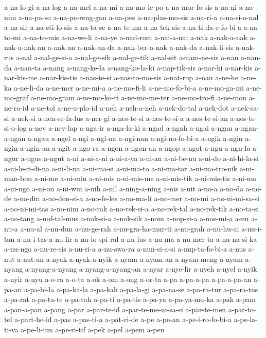 {a-na-lo-gi a-na-log a-na-mel a-na-mi a-na-mo-le-po a-na-mor-fo-sis a-na-ni
a-na-nim a-na-pa-so a-na-pe-reng-gan a-na-pes a-na-plas-mo-sis a-na-ri-a
a-na-si-o-nal a-na-sir a-na-sti-lo-sis a-na-ta-se a-na-te-ma a-na-tek-sis
a-na-ti-da-e-fo-bi-a a-na-to-mi a-na-to-mis a-na-we-li a-na-ye a-nad-rom
a-nai-a-nai a-nak a-nak-a-nak a-nak-a-nak-an a-nak-an a-nak-an-da
a-nak-ber-a-nak a-nak-da a-nak-li-sis a-nak-rus a-nal a-nal-ge-si-a
a-nal-ge-sik a-nal-ge-tik a-nal-sit a-nam-ne-sis a-nan a-nan-da a-nan-ta
a-nang a-nang-ke-la a-nang-ko-la-ki a-nap-tik-sis a-nar-ki a-nar-kis
a-nar-kis-me a-nar-kis-tis a-nas-te-si a-nas-to-mo-sis a-nat-rop a-nau
a-ne-he a-ne-ka a-ne-li-da a-ne-mer a-ne-mi-a a-ne-mo-fi-li
a-ne-mo-fo-bi-a a-ne-mo-ga-mi a-ne-mo-graf a-ne-mo-gram a-ne-mo-ko-ri
a-ne-mo-me-ter a-ne-mo-tro-fi a-ne-mon a-ne-ro-id a-ne-tol a-ne-u-plo-id
a-neh a-neh-a-neh a-nek-do-tal a-nek-dot a-nek-sa-si a-nek-si
a-nen-se-fa-lus a-ner-gi a-nes-te-si a-nes-te-si-a a-nes-te-si-an
a-nes-te-si-o-log a-nev a-nev-lap a-nga-ir a-nga-la-ki a-ngad a-ngah
a-ngai a-ngan a-ngan-a-ngan a-ngau a-ngel a-ngi a-ngi-na a-ngi-nan
a-ngi-no-fo-bi-a a-ngik a-ngin a-ngin-a-ngin-an a-ngit a-ngo-ra a-ngon
a-ngon-an a-ngop a-ngot a-ngu a-ngu-la a-ngur a-ngus a-ngut a-ni a-ni-a-ni
a-ni-a-ya a-ni-an a-ni-be-nu a-ni-do a-ni-hi-la-si a-ni-le-ri-di-na
a-ni-li-na a-ni-ma-si a-ni-ma-to a-ni-ma-tor a-ni-ma-tro-nik a-ni-man-bon
a-ni-me a-ni-min a-ni-mis a-ni-mis-me a-ni-mis-tik a-ni-mis-tis a-ni-mo
a-ni-ngo a-ni-on a-ni-wui a-nih a-nil a-ning-a-ning a-nis a-nit a-no-a
a-no-da a-no-de a-no-din a-no-don-si-a a-no-fe-les a-no-ma-li a-no-mer
a-no-mi a-no-ni-mi-sa-si a-no-ni-mi-tas a-no-nim a-no-rak a-no-rek-si-a
a-no-rek-tal a-no-rek-tik a-no-ta-si a-no-tang a-nof-tal-mus a-nok-si-a
a-nok-sik a-nom a-nop-si-a a-nos-mi-a a-nu a-nu-a a-nu-al a-nu-dun
a-nu-ge-rah a-nu-gra-ha-mur-ti a-nu-grah a-nu-hu-ai a-nu-i-tan a-nu-i-tas
a-nu-lir a-nu-lo-spi-ral a-nu-lus a-nu-ma a-nu-mer-ta a-nu-na-si-ka
a-nu-ngo a-nu-re-sis a-nu-ri-a a-nu-swa-ra a-nun-si-a-si a-nup-ta-fo-bi-a
a-nus a-nut a-nut-an a-nyak a-nyak-a-nyik a-nyam a-nyam-an
a-nyam-meng-a-nyam a-nyang a-nyang-a-nyang a-nyang-a-nyang-an a-nyar
a-nye-lir a-nyeh a-nyel a-nyik a-nyir a-nyu a-o-ra a-o-ta a-ok a-om a-ong
a-or-ta a-pa a-pa-a-pa a-pa-a-pa-an a-pa-an a-pa-bi-la a-pa-ka-la a-pa-kah
a-pa-la-gi a-pa-na-se a-pa-ra-tur a-pa-ra-tus a-pa-rat a-pa-ta-te a-pa-tah
a-pa-ti a-pa-tis a-pa-ya a-pa-ya-mu-ka a-pak a-pam a-pan-a-pan a-pang
a-par a-par-te-id a-par-te-me-ni-sa-si a-par-te-men a-par-to-tel
a-part-he-id a-pas a-pas-ti-a a-pat-ri-de a-pe a-pe-an a-pe-i-ro-fo-bi-a
a-pe-la-ti-va a-pe-li-um a-pe-ri-tif a-pek a-pel a-pem a-pen
}
